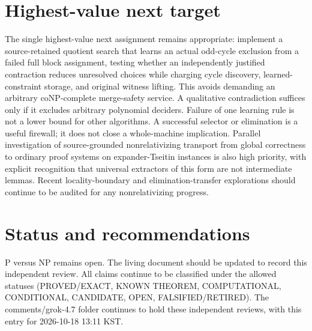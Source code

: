 \documentclass[11pt]{article}
\begin{document}
\section{Highest-value next target}
The single highest-value next assignment remains appropriate: implement a source-retained quotient search that learns an actual odd-cycle exclusion from a failed full block assignment, testing whether an independently justified contraction reduces unresolved choices while charging cycle discovery, learned-constraint storage, and original witness lifting. This avoids demanding an arbitrary coNP-complete merge-safety service. A qualitative contradiction suffices only if it excludes arbitrary polynomial deciders. Failure of one learning rule is not a lower bound for other algorithms. A successful selector or elimination is a useful firewall; it does not close a whole-machine implication. Parallel investigation of source-grounded nonrelativizing transport from global correctness to ordinary proof systems on expander-Tseitin instances is also high priority, with explicit recognition that universal extractors of this form are not intermediate lemmas. Recent locality-boundary and elimination-transfer explorations should continue to be audited for any nonrelativizing progress.

\section{Status and recommendations}
P versus NP remains open. The living document should be updated to record this independent review. All claims continue to be classified under the allowed statuses (PROVED/EXACT, KNOWN THEOREM, COMPUTATIONAL, CONDITIONAL, CANDIDATE, OPEN, FALSIFIED/RETIRED). The comments/grok-4.7 folder continues to hold these independent reviews, with this entry for 2026-10-18 13:11 KST.

\end{document}
